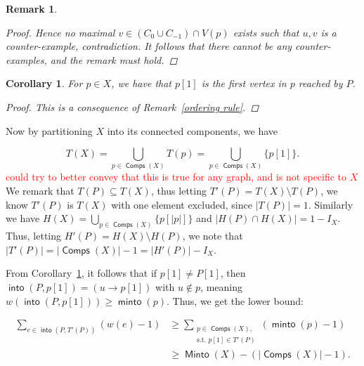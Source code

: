 \documentclass{article}
\newtheorem{rmk}[result]{Remark}
\newtheorem{cor}[result]{Corollary}
\theoremstyle{definition}
\DeclareMathOperator{\minto}{\bm{\mathsf{minto}}}
\DeclareMathOperator{\Minto}{\bm{\mathsf{Minto}}}
\DeclareMathOperator{\into}{\bm{\mathsf{into}}}
\DeclareMathOperator{\Comp}{\bm{\mathsf{Comps}}}
\newcommand{\hide}[1]{}
\newcommand{\edit}[1]{\textcolor{red}{#1}}
\begin{document}
\begin{rmk}
\begin{proof}
\vspace{0.75em}

Hence no maximal $v\in(C_0\cup C_{-1})\cap V(p)$ exists such that $u,v$ is a counter-example, contradiction. It follows that there cannot be any counter-examples, and the remark must hold.

\end{proof}

\hide{(this is a consequence of $v$ being the first reached in $c(v)$, first establishing this for the 1-cycle, and then by transitivity, as if we continue to visit another 1-cycle, we reach it with an edge $e \in E(P)$ from $u \in c(v) \cap C_{-1}$ to $v' \in C_0$, and $v$ comes before $u$ which comes before $v'$)} 

\end{rmk}

\vspace{1.75em}

\begin{cor}\label{path first} For $p \in X$, we have that $p[1]$ is the first vertex in $p$ reached by $P$. \begin{proof}This is a consequence of Remark~\ref{ordering rule}.\end{proof}\end{cor}

\vspace{1.75em}

Now by partitioning $X$ into its connected components, we have

\[T(X) = \bigcup_{p \in \Comp(X)} T(p) = \bigcup_{p \in \Comp(X)} \{p[1]\}.\]\edit{could try to better convey that this is true for any graph, and is not specific to $X$ }We remark that $T(P) \subseteq T(X)$, thus letting $T'(P) = T(X)\setminus T(P)$, we know $T'(P)$ is $T(X)$ with one element excluded, since $|T(P)| = 1$. Similarly we have $H(X) = \bigcup_{p \in \Comp(X)} \{p[|p|]\}$ and $|H(P) \cap H(X)| = 1-I_X$. Thus, letting $H'(P) = H(X)\setminus H(P)$, we note that $|T'(P)| = |\Comp(X)|-1 = |H'(P)|-I_X$.

From Corollary~\ref{path first}, it follows that if $p[1] \neq P[1]$, then $\into(P,p[1]) = (u \to p[1])$ with $u \not \in p$, meaning $w(\into(P,p[1])) \geq \minto(p)$. Thus, we get the lower bound:

\begin{align*}
    \sum_{e \in \into(P,T'(P))} (w(e)-1) &\geq \sum_{\substack{p \in \Comp(X),\\ \text{s.t. } p[1] \in T'(P)}}(\minto(p)-1)\\
    &\geq \Minto(X) - (|\Comp(X)|-1).\\
\end{align*}
\end{document}
